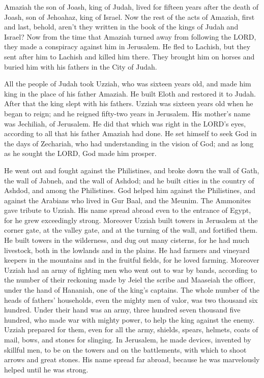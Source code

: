 \myverse{}Amaziah the son of Joash, king of Judah, lived for fifteen years
after the death of Joash, son of Jehoahaz, king of Israel.
\myverse{}Now the rest of the acts of Amaziah, first and last, behold, aren’t they
written in the book of the kings of Judah and Israel?
\myverse{}Now from the time that Amaziah turned away from following the LORD, they
made a conspiracy against him in Jerusalem. He fled to Lachish, but they sent after him to Lachish and
killed him there.
\myverse{}They brought him on horses and buried him with his fathers in the City of
Judah.


\mychapter{} \myverse*{}All the people of Judah took Uzziah, who was sixteen years old,
and made him king in the place of his father Amaziah.
\myverse{}He built Eloth and restored it to Judah. After that the king slept with his
fathers.
\myverse{}Uzziah was sixteen years old when he began to reign; and he reigned fifty-two
years in Jerusalem. His mother’s name was Jechiliah, of Jerusalem.
\myverse{}He did that which was right in the LORD’s eyes, according to all that his father
Amaziah had done.
\myverse{}He set himself to seek God in the days of Zechariah, who had understanding
in the vision of God; and as long as he sought the LORD, God made him prosper.

\myverse{}He went out and fought against the Philistines, and broke down
the wall of Gath, the wall of Jabneh, and the wall of Ashdod; and he built cities in the country of Ashdod,
and among the Philistines.
\myverse{}God helped him against the Philistines, and against the Arabians who lived
in Gur Baal, and the Meunim.
\myverse{}The Ammonites gave tribute to Uzziah. His name spread abroad even to the entrance
of Egypt, for he grew exceedingly strong.
\myverse{}Moreover Uzziah built towers in Jerusalem at the corner gate, at the valley
gate, and at the turning of the wall, and fortified them.
\myverse{}He built towers in the wilderness, and dug out many cisterns, for he had
much livestock, both in the lowlands and in the plains. He had farmers and vineyard keepers in the mountains
and in the fruitful fields, for he loved farming.
\myverse{}Moreover Uzziah had an army of fighting men who went out to war by bands,
according to the number of their reckoning made by Jeiel the scribe and Maaseiah the officer, under the
hand of Hananiah, one of the king’s captains.
\myverse{}The whole number of the heads of fathers’ households, even the mighty men
of valor, was two thousand six hundred.
\myverse{}Under their hand was an army, three hundred seven thousand five hundred,
who made war with mighty power, to help the king against the enemy.
\myverse{}Uzziah prepared for them, even for all the army, shields, spears, helmets,
coats of mail, bows, and stones for slinging.
\myverse{}In Jerusalem, he made devices, invented by skillful men, to be on the towers
and on the battlements, with which to shoot arrows and great stones. His name spread far abroad, because
he was marvelously helped until he was strong.

